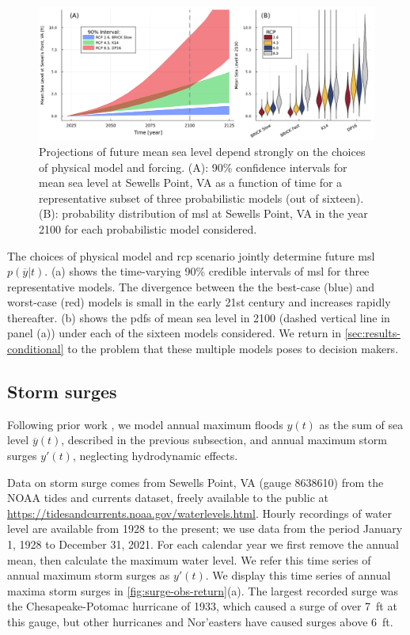 \documentclass[11pt]{article}
\makeatletter
\DeclareRobustCommand\onedot{\futurelet\@let@token\@onedot}
\def\@onedot{\ifx\@let@token.\else.\null\fi\xspace}
\def\eg{\emph{e.g}\onedot} \def\Eg{\emph{E.g}\onedot}
\DeclareRobustCommand\onedot{\futurelet\@let@token\@onedot}
\def\@onedot{\ifx\@let@token.\else.\null\fi\xspace}
\def\eg{\emph{e.g}\onedot} \def\Eg{\emph{E.g}\onedot}
\makeatother
\begin{document}
\begin{figure}
    \centering
    \includegraphics[width=\textwidth]{lsl-evolution}
    \caption{
        Projections of future mean sea level depend strongly on the choices of physical model and forcing.
        (A): 90\% confidence intervals for mean sea level at Sewells Point, VA as a function of time for a representative subset of three probabilistic models (out of sixteen).
        (B): probability distribution of \gls{msl} at Sewells Point, VA in the year 2100 for each probabilistic model considered.
    }\label{fig:lsl-evolution}
\end{figure}

The choices of physical model and \gls{rcp} scenario jointly determine future \gls{msl} $p(\overline{y}|t)$.
(a) shows the time-varying 90\% credible intervals of \gls{msl} for three representative models.
The divergence between the the best-case (blue) and worst-case (red) models is small in the early 21st century and increases rapidly thereafter.
(b) shows the \glspl{pdf} of mean sea level in 2100 (dashed vertical line in panel (a)) under each of the sixteen models considered.
We return in \cref{sec:results-conditional} to the problem that these multiple models poses to decision makers.

\subsection{Storm surges}\label{sec:case-surge}

Following prior work \citep[\eg,][]{garner_slrise:2018,lempert_slr:2012,sriver_sealevel:2018}, we model annual maximum floods $y(t)$ as the sum of sea level $\overline{y}(t)$, described in the previous subsection, and annual maximum storm surges $y'(t)$, neglecting hydrodynamic effects.

Data on storm surge comes from Sewells Point, VA (gauge 8638610) from the NOAA tides and currents dataset,  freely available to the public at \url{https://tidesandcurrents.noaa.gov/waterlevels.html}.
Hourly recordings of water level are available from 1928 to the present; we use data from the period January 1, 1928 to December 31, 2021.
For each calendar year we first remove the annual mean, then calculate the maximum water level.
We refer this time series of annual maximum storm surges as $y'(t)$.
We display this time series of annual maxima storm surges in \cref{fig:surge-obs-return}(a).
The largest recorded surge was the Chesapeake-Potomac hurricane of 1933, which caused a surge of over \SI{7}{ft} at this gauge, but other hurricanes and Nor'easters have caused surges above \SI{6}{ft}.
\end{document}
